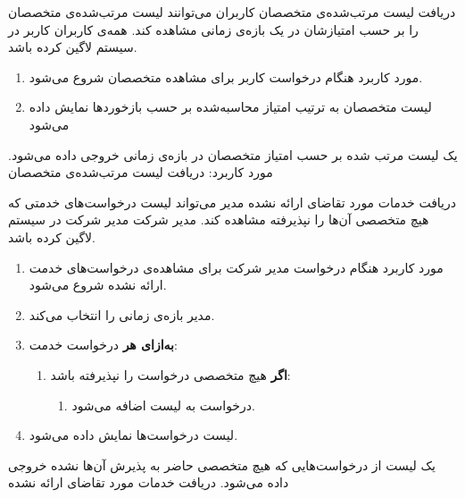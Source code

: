 {
\usecase
{دریافت لیست مرتب‌شده‌ی متخصصان}
{}
{کاربران می‌توانند لیست مرتب‌شده‌ی متخصصان را بر حسب امتیازشان در یک بازه‌ی زمانی مشاهده کند.}
{همه‌ی کاربران}
{}
{کاربر در سیستم لاگین کرده باشد.}
{
	\vspace*{-0.6cm}
	\begin{enumerate}
		\item 
		مورد کاربرد هنگام درخواست کاربر برای مشاهده متخصصان  شروع می‌شود.
		\item
لیست متخصصان به ترتیب امتیاز محاسبه‌شده بر حسب بازخوردها نمایش داده می‌شود	
		\end{enumerate}

}
{یک لیست مرتب شده بر حسب امتیاز متخصصان در بازه‌ی زمانی خروجی داده می‌شود.}
{
}
{
		مورد کاربرد: دریافت لیست مرتب‌شده‌ی متخصصان
}

}

{
\usecase
{دریافت خدمات مورد تقاضای ارائه نشده}
{}
{مدیر می‌تواند لیست درخواست‌های خدمتی که هیچ متخصصی آن‌ها را نپذیرفته مشاهده کند.}
{مدیر شرکت}
{}
{مدیر شرکت در سیستم لاگین کرده باشد.}
{
	\vspace*{-0.6cm}
	\begin{enumerate}
		\item 
		مورد کاربرد هنگام درخواست مدیر شرکت برای مشاهده‌ی درخواست‌های خدمت ارائه نشده شروع می‌شود.
		\item
		مدیر بازه‌ی زمانی را انتخاب می‌کند.
		\item
		\textbf{به‌ازای هر} درخواست خدمت:
		\begin{enumerate}[label=\theenumi.\arabic*.]
			\item 
			\textbf{اگر} هیچ متخصصی درخواست را نپذیرفته باشد:
			\begin{enumerate}
				\item 
				درخواست به لیست اضافه می‌شود.
			\end{enumerate}
		\end{enumerate}
		\item
		لیست درخواست‌ها نمایش داده می‌شود.
	\end{enumerate}
}
{یک لیست از درخواست‌هایی که هیچ متخصصی حاضر به پذیرش آن‌ها نشده خروجی داده می‌شود.}
{
}
{
	دریافت خدمات مورد تقاضای ارائه نشده
}
}

